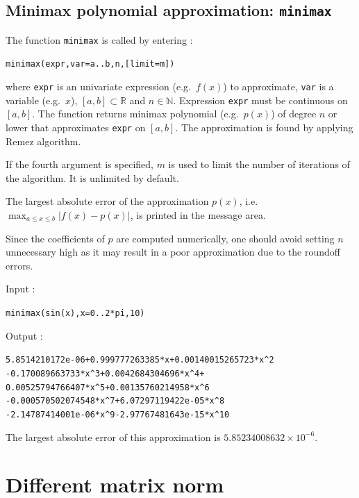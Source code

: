 \documentclass[a4paper,11pt]{book}
\begin{document}
\subsection{Minimax polynomial approximation: {\tt minimax}}

The function {\tt minimax} is called by entering :
\begin{center}
{\tt minimax(expr,var=a..b,n,[limit=m])}
\end{center}
where {\tt expr} is an univariate expression (e.g.~$ f(x) $) to approximate, {\tt var} is a variable (e.g.~$ x $), $ [a,b]\subset\mathbb{R} $ and $ n\in\mathbb{N} $. Expression {\tt expr} must be continuous on $ [a,b] $. The function returns minimax polynomial (e.g.~$ p(x) $) of degree $ n $ or lower that approximates {\tt expr} on $ [a,b] $. The approximation is found by applying Remez algorithm.

If the fourth argument is specified, $ m $ is used to limit the number of iterations of the algorithm. It is unlimited by default.

The largest absolute error of the approximation $ p(x) $, i.e.~$ \max_{a\leq x\leq b}|f(x)-p(x)| $, is printed in the message area.

Since the coefficients of $ p $ are computed numerically, one should avoid setting $ n $ unnecessary high as it may result in a poor approximation due to the roundoff errors.

\noindent Input :
\begin{center}
{\tt minimax(sin(x),x=0..2*pi,10)}
\end{center}
Output :
\begin{center}
{\tt 5.8514210172e-06+0.999777263385*x+0.00140015265723*x\verb|^|2}\\
{\tt -0.170089663733*x\verb|^|3+0.0042684304696*x\verb|^|4+}\\
{\tt 0.00525794766407*x\verb|^|5+0.00135760214958*x\verb|^|6}\\
{\tt -0.000570502074548*x\verb|^|7+6.07297119422e-05*x\verb|^|8}\\
{\tt -2.14787414001e-06*x\verb|^|9-2.97767481643e-15*x\verb|^|10}
\end{center}
The largest absolute error of this approximation is $ 5.85234008632\times 10^{-6} $.


\section{Different matrix norm}
\end{document}

